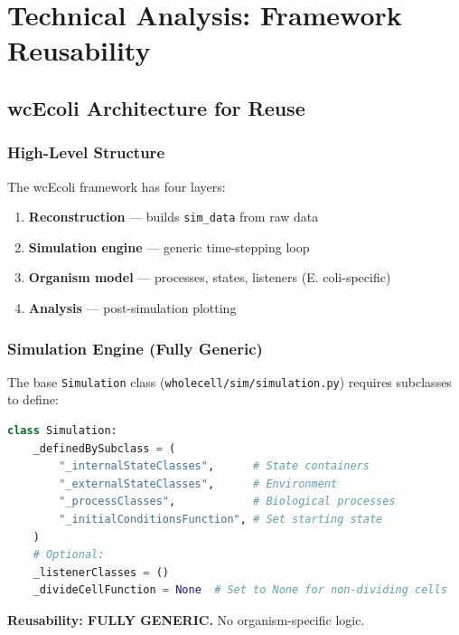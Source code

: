 \documentclass[11pt,a4paper]{report}
\begin{document}
\part{Technical Analysis: Framework Reusability}

\chapter{wcEcoli Architecture for Reuse}

\section{High-Level Structure}

The wcEcoli framework has four layers:

\begin{enumerate}
    \item \textbf{Reconstruction} --- builds \texttt{sim\_data} from raw data
    \item \textbf{Simulation engine} --- generic time-stepping loop
    \item \textbf{Organism model} --- processes, states, listeners (E. coli-specific)
    \item \textbf{Analysis} --- post-simulation plotting
\end{enumerate}

\section{Simulation Engine (Fully Generic)}

The base \texttt{Simulation} class (\texttt{wholecell/sim/simulation.py}) requires subclasses to define:

\begin{lstlisting}[language=Python]
class Simulation:
    _definedBySubclass = (
        "_internalStateClasses",      # State containers
        "_externalStateClasses",      # Environment
        "_processClasses",            # Biological processes
        "_initialConditionsFunction", # Set starting state
    )
    # Optional:
    _listenerClasses = ()
    _divideCellFunction = None  # Set to None for non-dividing cells
\end{lstlisting}

\textbf{Reusability: FULLY GENERIC.} No organism-specific logic.
\end{document}
